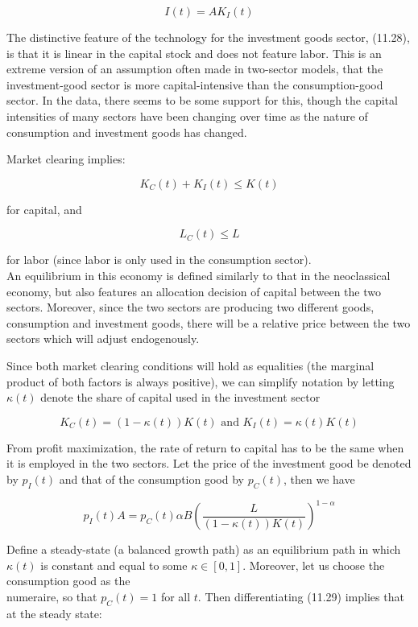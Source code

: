\documentclass[\topdir/lecture\_notes.tex]{subfiles}
\begin{document}
\[
I(t)=A K_{I}(t)
\]

The distinctive feature of the technology for the investment goods sector, (11.28), is that it is linear in the capital stock and does not feature labor. This is an extreme version of an assumption often made in two-sector models, that the investment-good sector is more capital-intensive than the consumption-good sector. In the data, there seems to be some support for this, though the capital intensities of many sectors have been changing over time as the nature of consumption and investment goods has changed.

Market clearing implies:

\[
K_{C}(t)+K_{I}(t) \leq K(t)
\]

for capital, and

\[
L_{C}(t) \leq L
\]

for labor (since labor is only used in the consumption sector).\\
An equilibrium in this economy is defined similarly to that in the neoclassical economy, but also features an allocation decision of capital between the two sectors. Moreover, since the two sectors are producing two different goods, consumption and investment goods, there will be a relative price between the two sectors which will adjust endogenously.

Since both market clearing conditions will hold as equalities (the marginal product of both factors is always positive), we can simplify notation by letting $\kappa(t)$ denote the share of capital used in the investment sector

\[
K_{C}(t)=(1-\kappa(t)) K(t) \text { and } K_{I}(t)=\kappa(t) K(t)
\]

From profit maximization, the rate of return to capital has to be the same when it is employed in the two sectors. Let the price of the investment good be denoted by $p_I(t)$ and that of the consumption good by $p_C(t)$, then we have

\[
p_{I}(t) A=p_{C}(t) \alpha B\left(\frac{L}{(1-\kappa(t)) K(t)}\right)^{1-\alpha}
\]

Define a steady-state (a balanced growth path) as an equilibrium path in which $\kappa(t)$ is constant and equal to some $\kappa \in[0,1]$. Moreover, let us choose the consumption good as the\\
numeraire, so that $p_C(t)=1$ for all $t$. Then differentiating (11.29) implies that at the steady state:
\end{document}
